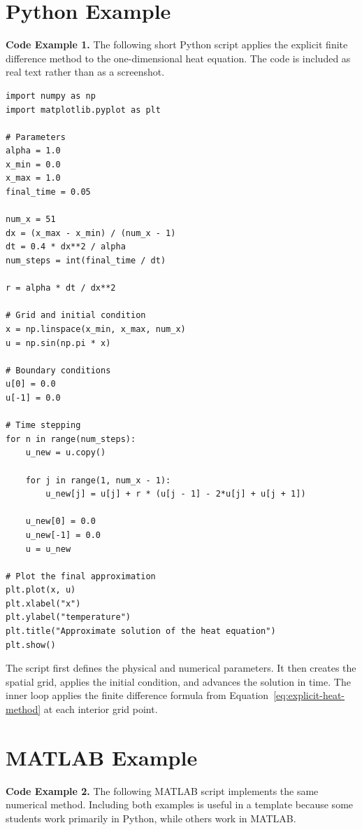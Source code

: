 \section{Python Example}
\label{sec:python-example}

\noindent\textbf{Code Example 1.}
The following short Python script applies the explicit finite difference method to the one-dimensional heat equation. The code is included as real text rather than as a screenshot.

\begin{verbatim}
import numpy as np
import matplotlib.pyplot as plt

# Parameters
alpha = 1.0
x_min = 0.0
x_max = 1.0
final_time = 0.05

num_x = 51
dx = (x_max - x_min) / (num_x - 1)
dt = 0.4 * dx**2 / alpha
num_steps = int(final_time / dt)

r = alpha * dt / dx**2

# Grid and initial condition
x = np.linspace(x_min, x_max, num_x)
u = np.sin(np.pi * x)

# Boundary conditions
u[0] = 0.0
u[-1] = 0.0

# Time stepping
for n in range(num_steps):
    u_new = u.copy()

    for j in range(1, num_x - 1):
        u_new[j] = u[j] + r * (u[j - 1] - 2*u[j] + u[j + 1])

    u_new[0] = 0.0
    u_new[-1] = 0.0
    u = u_new

# Plot the final approximation
plt.plot(x, u)
plt.xlabel("x")
plt.ylabel("temperature")
plt.title("Approximate solution of the heat equation")
plt.show()
\end{verbatim}

The script first defines the physical and numerical parameters. It then creates the spatial grid, applies the initial condition, and advances the solution in time. The inner loop applies the finite difference formula from Equation~\ref{eq:explicit-heat-method} at each interior grid point.

\section{MATLAB Example}
\label{sec:matlab-example}

\noindent\textbf{Code Example 2.}
The following MATLAB script implements the same numerical method. Including both examples is useful in a template because some students work primarily in Python, while others work in MATLAB.

